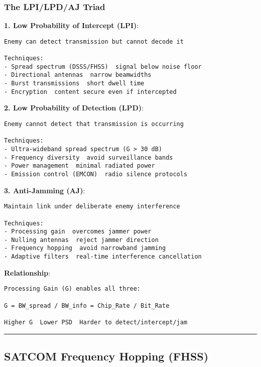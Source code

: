 \subsubsection{The LPI/LPD/AJ Triad}\label{the-lpilpdaj-triad}

\textbf{1. Low Probability of Intercept (LPI)}:

\begin{verbatim}
Enemy can detect transmission but cannot decode it

Techniques:
- Spread spectrum (DSSS/FHSS)  signal below noise floor
- Directional antennas  narrow beamwidths
- Burst transmissions  short dwell time
- Encryption  content secure even if intercepted
\end{verbatim}

\textbf{2. Low Probability of Detection (LPD)}:

\begin{verbatim}
Enemy cannot detect that transmission is occurring

Techniques:
- Ultra-wideband spread spectrum (G > 30 dB)
- Frequency diversity  avoid surveillance bands
- Power management  minimal radiated power
- Emission control (EMCON)  radio silence protocols
\end{verbatim}

\textbf{3. Anti-Jamming (AJ)}:

\begin{verbatim}
Maintain link under deliberate enemy interference

Techniques:
- Processing gain  overcomes jammer power
- Nulling antennas  reject jammer direction
- Frequency hopping  avoid narrowband jamming
- Adaptive filters  real-time interference cancellation
\end{verbatim}

\textbf{Relationship}:

\begin{verbatim}
Processing Gain (G) enables all three:

G = BW_spread / BW_info = Chip_Rate / Bit_Rate

Higher G  Lower PSD  Harder to detect/intercept/jam
\end{verbatim}

\begin{center}\rule{0.5\linewidth}{0.5pt}\end{center}

\subsection{\texorpdfstring{ SATCOM Frequency Hopping
(FHSS)}{ SATCOM Frequency Hopping (FHSS)}}\label{satcom-frequency-hopping-fhss}

